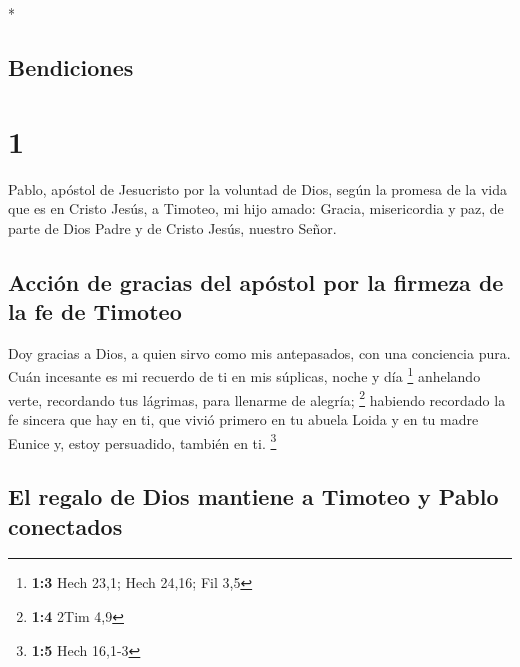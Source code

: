 \begin{paracol}{2} \switchcolumn[0]*

\hypertarget{bendiciones}{%
\subsection{Bendiciones}\label{bendiciones}}

\hypertarget{section}{%
\section{1}\label{section}}

 Pablo, apóstol de Jesucristo por la voluntad de Dios,
según la promesa de la vida que es en Cristo Jesús,  a
Timoteo, mi hijo amado: Gracia, misericordia y paz, de parte de Dios
Padre y de Cristo Jesús, nuestro Señor.

\hypertarget{acciuxf3n-de-gracias-del-apuxf3stol-por-la-firmeza-de-la-fe-de-timoteo}{%
\subsection{Acción de gracias del apóstol por la firmeza de la fe de
Timoteo}\label{acciuxf3n-de-gracias-del-apuxf3stol-por-la-firmeza-de-la-fe-de-timoteo}}

 Doy gracias a Dios, a quien sirvo como mis antepasados,
con una conciencia pura. Cuán incesante es mi recuerdo de ti en mis
súplicas, noche y día \footnote{\textbf{1:3} Hech 23,1; Hech 24,16; Fil
  3,5}  anhelando verte, recordando tus lágrimas, para
llenarme de alegría; \footnote{\textbf{1:4} 2Tim 4,9} 
habiendo recordado la fe sincera que hay en ti, que vivió primero en tu
abuela Loida y en tu madre Eunice y, estoy persuadido, también en ti.
\footnote{\textbf{1:5} Hech 16,1-3}

\hypertarget{el-regalo-de-dios-mantiene-a-timoteo-y-pablo-conectados}{%
\subsection{El regalo de Dios mantiene a Timoteo y Pablo
conectados}\label{el-regalo-de-dios-mantiene-a-timoteo-y-pablo-conectados}}


\end{paracol}
